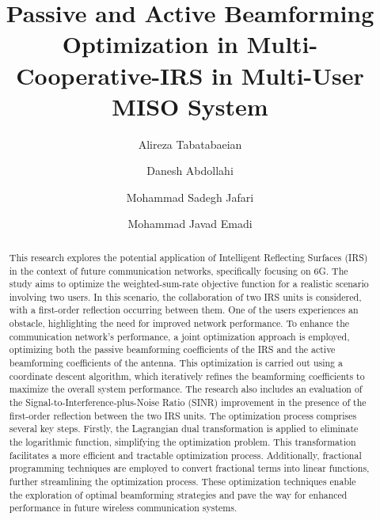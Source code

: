 \documentclass[review]{elsarticle}
\begin{document}
	
	\begin{frontmatter}
		
		\title{Passive and Active Beamforming Optimization in Multi-Cooperative-IRS in Multi-User MISO System}
		
		\author[]{Alireza Tabatabaeian}
		\author[]{Danesh Abdollahi}
		\author[]{Mohammad Sadegh Jafari}
		\author[]{Mohammad Javad Emadi}
		
	
		\begin{abstract}
			This research explores the potential application of Intelligent Reflecting Surfaces (IRS) in the context of future communication networks, specifically focusing on 6G. The study aims to optimize the weighted-sum-rate objective function for a realistic scenario involving two users. In this scenario, the collaboration of two IRS units is considered, with a first-order reflection occurring between them. One of the users experiences an obstacle, highlighting the need for improved network performance.
			To enhance the communication network's performance, a joint optimization approach is employed, optimizing both the passive beamforming coefficients of the IRS and the active beamforming coefficients of the antenna. This optimization is carried out using a coordinate descent algorithm, which iteratively refines the beamforming coefficients to maximize the overall system performance. The research also includes an evaluation of the Signal-to-Interference-plus-Noise Ratio (SINR) improvement in the presence of the first-order reflection between the two IRS units.
			The optimization process comprises several key steps. Firstly, the Lagrangian dual transformation is applied to eliminate the logarithmic function, simplifying the optimization problem. This transformation facilitates a more efficient and tractable optimization process. Additionally, fractional programming techniques are employed to convert fractional terms into linear functions, further streamlining the optimization process. These optimization techniques enable the exploration of optimal beamforming strategies and pave the way for enhanced performance in future wireless communication systems.
		\end{abstract}
		
		
	\end{frontmatter}
	
\end{document}
